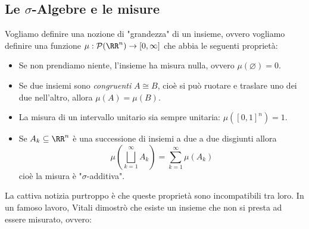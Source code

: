 \documentclass[11pt]{scrartcl}
\newcommand{\eset}{\varnothing}
\newcommand{\parti}[1]{\mathcal{P}\!\left(#1\right)}
\begin{document}
	\subsection{Le $\sigma$-Algebre e le misure}
	
	Vogliamo definire una nozione di "grandezza" di un insieme, ovvero vogliamo definire una funzione $\mu:\parti{\RR^n}\to [0,\infty]$ che abbia le seguenti proprietà:
	\begin{itemize}
		\item Se non prendiamo niente, l'insieme ha misura nulla, ovvero $\mu(\eset)=0$.
		\item Se due insiemi sono \textit{congruenti} $A\cong B$, cioè si può ruotare e traslare uno dei due nell'altro, allora $\mu(A)=\mu(B)$.
		\item La misura di un intervallo unitario sia sempre unitaria: $\mu(\left[0,1\right]^n)=1$.
		\item Se $A_k\subseteq \RR^n$ è una successione di insiemi a due a due disgiunti allora
		$$\mu\left(\bigsqcup_{k=1}^\infty A_k\right)=\sum_{k=1}^{\infty}\mu(A_k)$$
		cioè la misura è "$\sigma$-additiva".
	\end{itemize}
	La cattiva notizia purtroppo è che queste proprietà sono incompatibili tra loro. In un famoso lavoro, Vitali dimostrò che esiste un insieme che non si presta ad essere misurato, ovvero:
\end{document}

